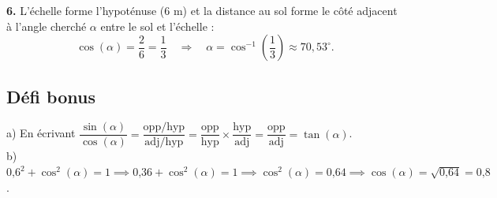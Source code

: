 \documentclass[11pt,a4paper]{article}
\newcommand{\dec}{{,}} %
\begin{document}
\textbf{6.} L'échelle forme l'hypoténuse ($6\text{ m}$) et la distance au sol forme le côté adjacent à l'angle cherché $\alpha$ entre le sol et l'échelle :
\[
\cos(\alpha) = \frac{2}{6} = \frac{1}{3} \quad\Longrightarrow\quad \alpha = \cos^{-1}\left(\frac{1}{3}\right) \approx 70\dec 53^\circ.
\]

\subsection*{Défi bonus}

a) En écrivant $\dfrac{\sin(\alpha)}{\cos(\alpha)} = \dfrac{\text{opp}/\text{hyp}}{\text{adj}/\text{hyp}} = \dfrac{\text{opp}}{\text{hyp}} \times \dfrac{\text{hyp}}{\text{adj}} = \dfrac{\text{opp}}{\text{adj}} = \tan(\alpha)$.\\
b) $0\mbox{,}6^2 + \cos^2(\alpha) = 1 \implies 0\mbox{,}36 + \cos^2(\alpha) = 1 \implies \cos^2(\alpha) = 0\mbox{,}64 \implies \cos(\alpha) = \sqrt{0\mbox{,}64} = 0\mbox{,}8$.
\end{document}

